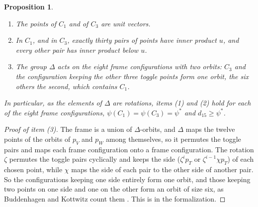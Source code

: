 \documentclass[12pt]{amsart}
\newtheorem{proposition}[theorem]{Proposition}
\theoremstyle{definition}
\theoremstyle{plain}
\theoremstyle{definition}
\newcommand{\psis}{\psi^{*}}
\newcommand{\CI}{C_1}
\newcommand{\CIII}{C_3}
\newcommand{\leanmap}[1]{\ignorespaces}
\newcommand{\codemap}[1]{\ignorespaces}
\newcommand{\mapnote}[1]{\ignorespaces}
\begin{document}
\begin{proposition}\label{prop:optima}\leanmap{Tammes15.Attained.attained, Tammes15.Nonunique.frameC1_sep_lt, Tammes15.Nonunique.frameC3_sep_lt, Tammes15.PaperSteps.optima_four}\mapnote{items (1) and (2) for $C_1$ and $C_3$ as the first declaration, with inner products at most $u$ for the other pairs, the strict inequalities as the second and third; item (3), the last declaration, on sets of points: each element of $\Delta$ maps each frame configuration onto a frame configuration, $C_3$ and $C_1$ are the frame configurations of their toggle points, and their orbits are those of item (3)}\codemap{code/sage/bk15_exact.sage > code/sage/bk15_exact.out, code/lean-data/d4_cut.sage > code/lean-data/d4_cut.out, code/lean-data/regen.sh > code/lean-data/regen.out}
\begin{enumerate}
\item The points of $\CI$ and of $\CIII$ are unit vectors.
\item In $\CI$, and in $\CIII$, exactly thirty pairs of points have inner product $u$, and every other pair has inner product below $u$.
\item The group $\Delta$ acts on the eight frame configurations with two orbits: $\CIII$ and the configuration keeping the other three toggle points form one orbit, the six others the second, which contains $\CI$.
\end{enumerate}
In particular, as the elements of $\Delta$ are rotations, items (1) and (2) hold for each of the eight frame configurations, $\psi(\CI)=\psi(\CIII)=\psis$ and $d_{15}\ge\psis$.
\end{proposition}

\begin{proof}[Proof of item (3)]
The frame is a union of $\Delta$-orbits, and $\Delta$ maps the twelve points of the orbits of $p_V$ and $p_W$ among themselves, so it permutes the toggle pairs and maps each frame configuration onto a frame configuration. The rotation $\zeta$ permutes the toggle pairs cyclically and keeps the side ($\zeta^ip_T$ or $\zeta^{i-1}\chi p_T$) of each chosen point, while $\chi$ maps the side of each pair to the other side of another pair. So the configurations keeping one side entirely form one orbit, and those keeping two points on one side and one on the other form an orbit of size six, as Buddenhagen and Kottwitz count them \cite[Section~7]{BK}. This is  in the formalization.
\end{proof}
\end{document}
